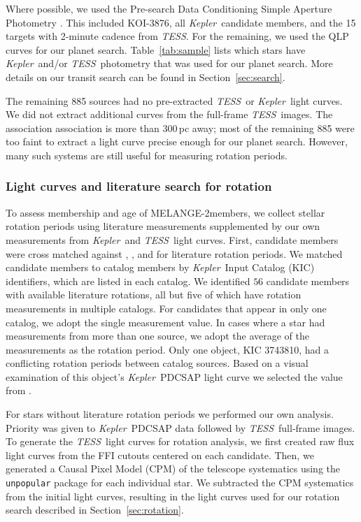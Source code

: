\documentclass[twocolumn]{aastex631}
\newcommand{\starname}{KOI-3876}
\newcommand{\kepler}{{\it Kepler}}
\newcommand{\tess}{\textit{TESS}}
\newcommand{\association}{MELANGE-2}
\begin{document}
Where possible, we used the Pre-search Data Conditioning Simple Aperture Photometry \citep[PDCSAP;][]{Smith2012, Stumpe2012}. This included \starname, all \kepler\ candidate members, and the 15 targets with 2-minute cadence from \tess. For the remaining, we used the QLP curves for our planet search. Table~\ref{tab:sample} lists which stars have \kepler\ and/or \tess\ photometry that was used for our planet search. More details on our transit search can be found in Section~\ref{sec:search}.

The remaining 885 sources had no pre-extracted \tess\ or \kepler\ light curves. We did not extract additional curves from the full-frame \tess\ images. The association association is more than 300\,pc away; most of the remaining 885 were too faint to extract a light curve precise enough for our planet search. However, many such systems are still useful for measuring rotation periods.


\subsubsection{Light curves and literature search for rotation}\label{sub:rot_collection}

To assess membership and age of \association members, we collect stellar rotation periods using literature measurements supplemented by our own measurements from \kepler\ and \tess\ light curves. First, candidate members were cross matched against \citet{Nielsen:2013}, \citet{McQuillan2013, 2014ApJS..211...24M}, and \citet{Santos2019, Santos2021} for literature rotation periods. We matched candidate members to catalog members by \kepler\ Input Catalog (KIC) identifiers, which are listed in each catalog. We identified $56$ candidate members with available literature rotations, all but five of which have rotation measurements in multiple catalogs. For candidates that appear in only one catalog, we adopt the single measurement value. In cases where a star had measurements from more than one source, we adopt the average of the measurements as the rotation period. Only one object, KIC 3743810, had a conflicting rotation periods between catalog sources. Based on a visual examination of this object's \kepler\ PDCSAP light curve we selected the value from \citet{Nielsen:2013}.

For stars without literature rotation periods we performed our own analysis. Priority was given to \kepler\ PDCSAP data followed by \tess\ full-frame images. To generate the \tess\ light curves for rotation analysis, we first created raw flux light curves from the FFI cutouts centered on each candidate. Then, we generated a Causal Pixel Model (CPM) of the telescope systematics using the \texttt{unpopular} package \citep{2021arXiv210615063H} for each individual star. We subtracted the CPM systematics from the initial light curves, resulting in the light curves used for our rotation search described in Section~\ref{sec:rotation}.
\end{document}
